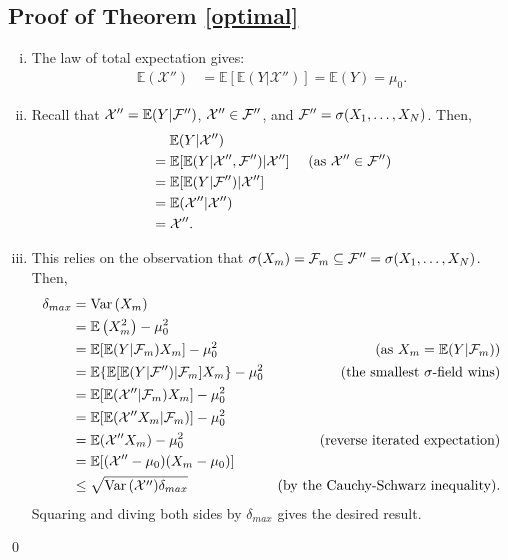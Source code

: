 \documentclass[11pt]{article}
\newcommand{\E}{\mathbb{E}}
\theoremstyle{definition}
\theoremstyle{definition}
\def\F{{\cal F}}
\def\E{{\mathbb E}}
\def\Var{{\rm Var}\,}
\begin{document}
\subsection{Proof of Theorem \ref{optimal}}
\begin{enumerate}[i)]
\item The law of total expectation gives:
\begin{align*}
\E(\mathcal{X}'') &= \E[\E(Y|\mathcal{X}'')] =  \E(Y) = \mu_0.
\end{align*}

\item Recall that $ \mathcal{X}'' = \E(Y | \F'')$, $\mathcal{X}'' \in \F''$, and $\F'' = \sigma(X_1, \dots, X_N)$. Then,
\begin{align*}
&\hspace{1.3em}  \E(Y | \mathcal{X}'') \\
 &= \E[\E(Y|\mathcal{X}'',\F'')|\mathcal{X}''] & \text{ (as $\mathcal{X}'' \in \F''$)}\\
&= \E[\E(Y|\F'')|\mathcal{X}'']\\
&= \E(\mathcal{X}''|\mathcal{X}'') \\
&= \mathcal{X}''.
\end{align*}

\item This relies on the observation that $\sigma(X_m) = \F_m \subseteq \F'' = \sigma(X_1, \dots, X_N)$. Then,
\begin{align*}
\delta_{max} &=\Var(X_m)\\
 &= \E\left(X_m^2\right) - \mu_0^2\\
 &= \E[\E(Y|\F_m)X_m] - \mu_0^2 & \text{(as $X_m = \E(Y|\F_m)$)}\\
 &= \E\{\E[\E(Y|\F'')|\F_m]X_m\} - \mu_0^2 & \text{(the smallest $\sigma$-field wins)}\\
 &= \E[\E(\mathcal{X}''|\F_m)X_m] - \mu_0^2 \\
 &= \E[\E(\mathcal{X}''X_m|\F_m)] - \mu_0^2 \\
 &= \E(\mathcal{X}''X_m) - \mu_0^2 & \text{(reverse iterated expectation)} \\
 &= \E[(\mathcal{X}''-\mu_0)(X_m-\mu_0)]  \\
 &\leq \sqrt{\Var(\mathcal{X}'')\delta_{max} } & \text{(by the Cauchy-Schwarz inequality).} 
\end{align*}
Squaring and diving both sides by $\delta_{max} $ gives the desired result. 

\end{enumerate}
\qed
\end{document}

